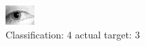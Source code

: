 \begin{figure}[h!]
\begin{center}
\includegraphics[width=0.60\columnwidth]{figures/ID1257_class_4_target_3.png}
\end{center}
\caption{ Classification: 4 actual target: 3}
\label{fig:ID1257_class_4_target_3}
\end{figure}
